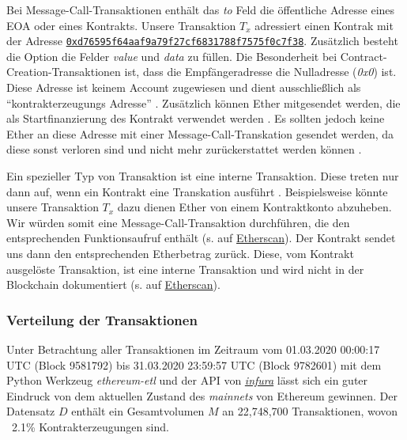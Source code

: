 \documentclass[runningheads]{llncs}
\begin{document}
Bei Message-Call-Transaktionen enthält das \textit{to} Feld die öffentliche Adresse eines EOA oder eines Kontrakts. Unsere Transaktion $T_x$ adressiert einen Kontrak mit der Adresse \href{https://ropsten.etherscan.io/address/0xd76595f64aaf9a79f27cf6831788f7575f0c7f38}{\texttt{0xd76595f64aaf9a79f27cf6831788f7575f0c7f38}}. Zusätzlich besteht die Option die Felder \textit{value} und \textit{data} zu füllen. 
Die Besonderheit bei Contract-Creation-Transaktionen ist, dass die Empfängeradresse die Nulladresse (\textit{0x0}) ist. Diese Adresse ist keinem Account zugewiesen und dient ausschließlich als "`kontrakterzeugungs Adresse"' \cite{antonopoulos_mastering_2019}. Zusätzlich können Ether mitgesendet werden, die als Startfinanzierung des Kontrakt verwendet werden \cite[S. 4]{wood_ethereum/yellowpaper_2019}. Es sollten jedoch keine Ether an diese Adresse mit einer Message-Call-Transkation gesendet werden, da diese sonst verloren sind und nicht mehr zurückerstattet werden können \cite[S. 112]{antonopoulos_mastering_2019}.

Ein spezieller Typ von Transaktion ist eine interne Transaktion. Diese treten nur dann auf, wenn ein Kontrakt eine Transkation ausführt \cite[S. 40]{antonopoulos_mastering_2019}. Beispielsweise könnte unsere Transaktion $T_x$ dazu dienen Ether von einem Kontraktkonto abzuheben. Wir würden somit eine Message-Call-Transaktion durchführen, die den entsprechenden Funktionsaufruf enthält (s. auf \href{https://ropsten.etherscan.io/tx/0xeb5022156e0fa4fdd2ff7045b59b9a3d90317f6e4a15f91a5aa044c8a645d7cb}{Etherscan}). Der Kontrakt sendet uns dann den entsprechenden Etherbetrag zurück. Diese, vom Kontrakt ausgelöste Transaktion, ist eine interne Transaktion und wird nicht in der Blockchain dokumentiert (s. auf \href{https://ropsten.etherscan.io/tx/0xeb5022156e0fa4fdd2ff7045b59b9a3d90317f6e4a15f91a5aa044c8a645d7cb#internal}{Etherscan}).

\subsubsection{Verteilung der Transaktionen}
Unter Betrachtung aller Transaktionen im Zeitraum vom 01.03.2020 00:00:17 UTC (Block 9581792) bis 31.03.2020 23:59:57 UTC (Block 9782601) mit dem Python Werkzeug \textit{ethereum-etl} \cite{noauthor_blockchain-etl/ethereum-etl_2020} und der API von \href{https://infura.io/}{\textit{infura}} lässt sich ein guter Eindruck von dem aktuellen Zustand des \textit{mainnets} von Ethereum gewinnen. Der Datensatz $ D $ enthält ein Gesamtvolumen $ M $ an 22,748,700 Transaktionen, wovon ~2.1\% Kontrakterzeugungen sind. 
\end{document}
